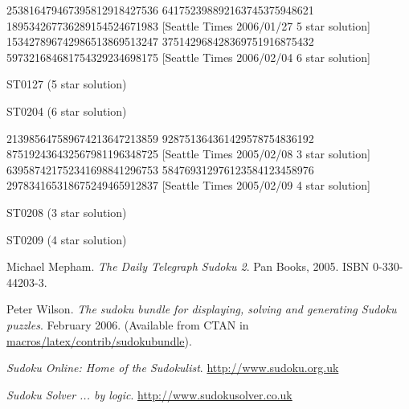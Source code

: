 \documentclass[twoside]{article}
\begin{document}
\renewcommand*{\puzzlefile}{st0127.ans}
\writepuzzle%
{253816479}{467395812}{918427536}%
{641752398}{892163745}{375948621}%
{189534267}{736289154}{524671983}%
[Seattle Times 2006/01/27 5 star solution]
\renewcommand*{\puzzlefile}{st0204.ans}
\writepuzzle%
{153427896}{742986513}{869513247}%
{375142968}{428369751}{916875432}%
{597321684}{681754329}{234698175}%
[Seattle Times 2006/02/04 6 star solution]
\vfill
\noindent\begin{minipage}{0.47\linewidth}\begin{center}
ST0127 (5 star solution) \\
\end{center}\end{minipage}
\hfill
\begin{minipage}{0.47\linewidth}\begin{center}
ST0204 (6 star solution) \\
\end{center}\end{minipage}

\renewcommand*{\puzzlefile}{st0208.ans}
\writepuzzle%
{213985647}{589674213}{647213859}%
{928751364}{361429578}{754836192}%
{875192436}{432567981}{196348725}%
[Seattle Times 2005/02/08 3 star solution]
\renewcommand*{\puzzlefile}{st0209.ans}
\writepuzzle%
{639587421}{752341698}{841296753}%
{584769312}{976123584}{123458976}%
{297834165}{318675249}{465912837}%
[Seattle Times 2005/02/09 4 star solution]
\vfill
\noindent\begin{minipage}{0.47\linewidth}\begin{center}
ST0208 (3 star solution) \\
\end{center}\end{minipage}
\hfill
\begin{minipage}{0.47\linewidth}\begin{center}
ST0209 (4 star solution) \\
\end{center}\end{minipage}

\cleardoublepage


\begingroup
\raggedright
\begin{thebibliography}{GMSN94A}

Michael Mepham.
\emph{The Daily Telegraph Sudoku 2}.
\newblock Pan Books, 2005.
\newblock ISBN 0-330-44203-3.

Peter Wilson.
\emph{The sudoku bundle for displaying, solving and generating
      Sudoku puzzles}.
\newblock February 2006.
\newblock (Available from CTAN in \url{macros/latex/contrib/sudokubundle}).

\emph{Sudoku Online: Home of the Sudokulist}.
\newblock \url{http://www.sudoku.org.uk}

\emph{Sudoku Solver ... by logic}.
\newblock \url{http://www.sudokusolver.co.uk}

\end{thebibliography}
\endgroup
\end{document}
